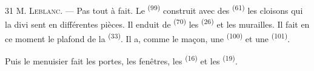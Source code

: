 \begin{VUpage}[33]{31}
\VUblancAlinea
\textsc{M. Leblanc}. --- Pas tout à fait. Le  \textsuperscript{(99)}\nl
construit avec des  \textsuperscript{(61)} les cloisons qui la divi\cc
sent en différentes pièces. Il enduit de  \textsuperscript{(70)}\nl
les  \textsuperscript{(26)} et les murailles. Il fait en ce moment\nl
le plafond de la  \textsuperscript{(33)}. Il a, comme le maçon,\nl
une  \textsuperscript{(100)} et une  \textsuperscript{(101)}.

\VUblancAlinea
Puis le menuisier fait les portes, les fenêtres, les\nl
{} \textsuperscript{(16)} et les  \textsuperscript{(19)}.
\end{VUpage}

